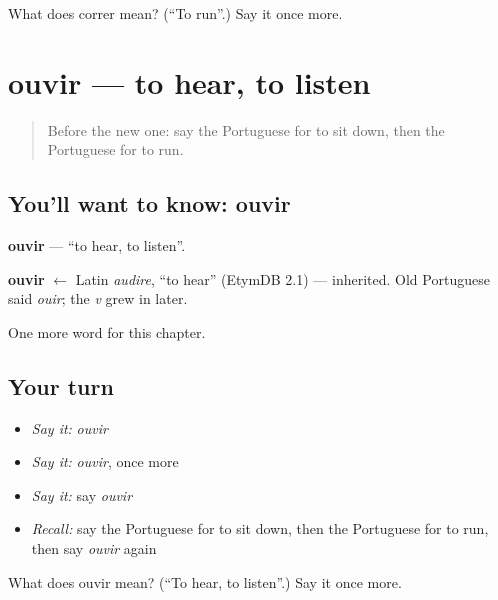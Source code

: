 \begin{tcolorbox}[breakable,colback=teal!4,colframe=teal!35!black,title={Before you move on}]
What does correr mean? (\textquotedblleft{}To run\textquotedblright{}.) Say it once more.
\end{tcolorbox}
\section[ouvir]{ouvir — to hear, to listen}

\label{lesson:PT-C42-ouvir}



\begin{quote}
Before the new one: say the Portuguese for to sit down, then the Portuguese for to run.
\end{quote}

\subsection*{You'll want to know: ouvir}
\textbf{ouvir} — \textquotedblleft{}to hear, to listen\textquotedblright{}.

\begin{cousinweb}
\textbf{ouvir} $\leftarrow$ Latin \emph{audire}, \textquotedblleft{}to hear\textquotedblright{} (EtymDB 2.1) — inherited. Old Portuguese said \emph{ouir}; the \emph{v} grew in later.
\end{cousinweb}

\begin{grammarlens}[title={What you've built}]
One more word for this chapter.
\end{grammarlens}

\subsection*{Your turn}
\begin{itemize}
\raggedright
  \item \emph{Say it:} \emph{ouvir}
  \item \emph{Say it:} \emph{ouvir}, once more
  \item \emph{Say it:} say \emph{ouvir}
  \item \emph{Recall:} say the Portuguese for to sit down, then the Portuguese for to run, then say \emph{ouvir} again
\end{itemize}

\begin{tcolorbox}[breakable,colback=teal!4,colframe=teal!35!black,title={Before you move on}]
What does ouvir mean? (\textquotedblleft{}To hear, to listen\textquotedblright{}.) Say it once more.
\end{tcolorbox}
